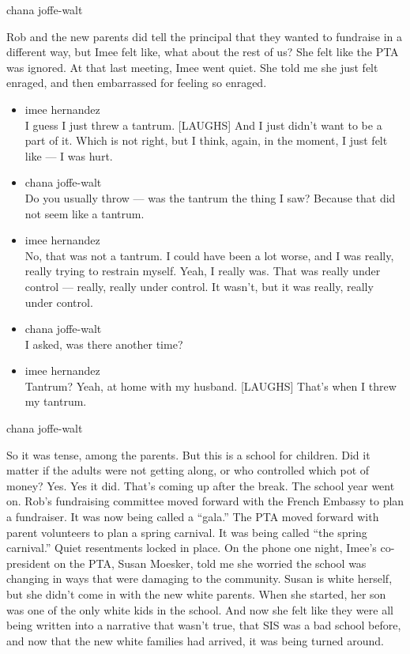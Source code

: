 chana joffe-walt

Rob and the new parents did tell the principal that they wanted to
fundraise in a different way, but Imee felt like, what about the rest of
us? She felt like the PTA was ignored. At that last meeting, Imee went
quiet. She told me she just felt enraged, and then embarrassed for
feeling so enraged.

\begin{itemize}
\item
  imee hernandez\\
  I guess I just threw a tantrum. {[}LAUGHS{]} And I just didn't want to
  be a part of it. Which is not right, but I think, again, in the
  moment, I just felt like --- I was hurt.
\item
  chana joffe-walt\\
  Do you usually throw --- was the tantrum the thing I saw? Because that
  did not seem like a tantrum.
\item
  imee hernandez\\
  No, that was not a tantrum. I could have been a lot worse, and I was
  really, really trying to restrain myself. Yeah, I really was. That was
  really under control --- really, really under control. It wasn't, but
  it was really, really under control.
\item
  chana joffe-walt\\
  I asked, was there another time?
\item
  imee hernandez\\
  Tantrum? Yeah, at home with my husband. {[}LAUGHS{]} That's when I
  threw my tantrum.
\end{itemize}

chana joffe-walt

So it was tense, among the parents. But this is a school for children.
Did it matter if the adults were not getting along, or who controlled
which pot of money? Yes. Yes it did. That's coming up after the break.
The school year went on. Rob's fundraising committee moved forward with
the French Embassy to plan a fundraiser. It was now being called a
``gala.'' The PTA moved forward with parent volunteers to plan a spring
carnival. It was being called ``the spring carnival.'' Quiet resentments
locked in place. On the phone one night, Imee's co-president on the PTA,
Susan Moesker, told me she worried the school was changing in ways that
were damaging to the community. Susan is white herself, but she didn't
come in with the new white parents. When she started, her son was one of
the only white kids in the school. And now she felt like they were all
being written into a narrative that wasn't true, that SIS was a bad
school before, and now that the new white families had arrived, it was
being turned around.

